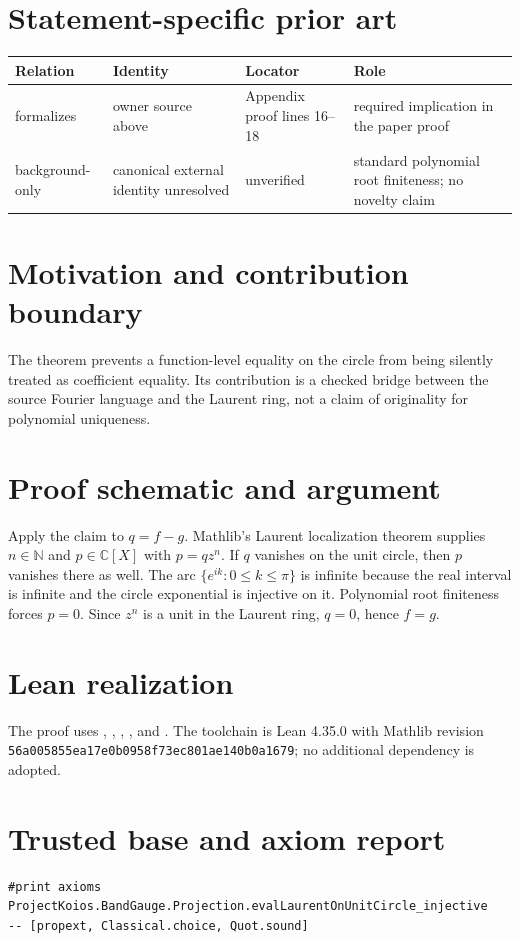 \documentclass[11pt]{article}
\begin{document}
\section{Statement-specific prior art}
\begin{tabularx}{\textwidth}{@{}lXXX@{}}\toprule
Relation & Identity & Locator & Role \\
\midrule
formalizes & owner source above & Appendix proof lines 16--18 & required implication in the paper proof \\
background-only & canonical external identity unresolved & unverified & standard polynomial root finiteness; no novelty claim \\
\bottomrule\end{tabularx}

\section{Motivation and contribution boundary}
The theorem prevents a function-level equality on the circle from being silently treated
as coefficient equality. Its contribution is a checked bridge between the source Fourier
language and the Laurent ring, not a claim of originality for polynomial uniqueness.

\section{Proof schematic and argument}
Apply the claim to $q=f-g$. Mathlib's Laurent localization theorem supplies
$n\in\mathbb N$ and $p\in\mathbb C[X]$ with
$p=qz^n$. If $q$ vanishes on the unit circle, then $p$ vanishes there as well. The arc
$\{e^{ik}:0\le k\le\pi\}$ is infinite because the real interval is infinite and the
circle exponential is injective on it. Polynomial root finiteness forces $p=0$.
Since $z^n$ is a unit in the Laurent ring, $q=0$, hence $f=g$.

\section{Lean realization}
The proof uses ,
, ,
, and . The toolchain is
Lean 4.35.0 with Mathlib revision
\texttt{56a005855ea17e0b0958f73ec801ae140b0a1679}; no additional dependency is adopted.

\section{Trusted base and axiom report}
\begin{lstlisting}
#print axioms ProjectKoios.BandGauge.Projection.evalLaurentOnUnitCircle_injective
-- [propext, Classical.choice, Quot.sound]
\end{lstlisting}
\end{document}

